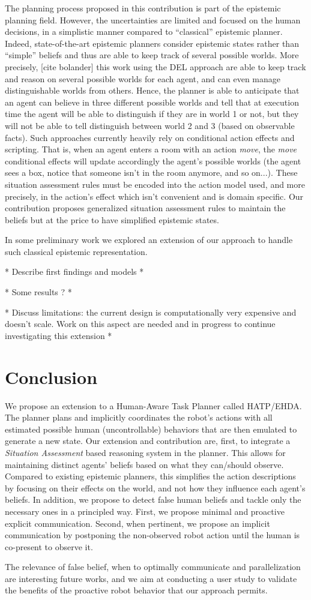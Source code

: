 The planning process proposed in this contribution is part of the epistemic planning field. However, the uncertainties are limited and focused on the human decisions, in a simplistic manner compared to ``classical'' epistemic planner. Indeed, state-of-the-art epistemic planners consider epistemic states rather than ``simple'' beliefs and thus are able to keep track of several possible worlds. More precisely, [cite bolander] this work using the DEL approach are able to keep track and reason on several possible worlds for each agent, and can even manage distinguishable worlds from others. Hence, the planner is able to anticipate that an agent can believe in three different possible worlds and tell that at execution time the agent will be able to distinguish if they are in world 1 or not, but they will not be able to tell distinguish between world 2 and 3 (based on observable facts).
Such approaches currently heavily rely on conditional action effects and scripting. That is, when an agent enters a room with an action \textit{move}, the \textit{move} conditional effects will update accordingly the agent's possible worlds (the agent sees a box, notice that someone isn't in the room anymore, and so on...). These situation assessment rules must be encoded into the action model used, and more precisely, in the action's effect which isn't convenient and is domain specific.
Our contribution proposes generalized situation assessment rules to maintain the beliefs but at the price to have simplified epistemic states.

In some preliminary work we explored an extension of our approach to handle such classical epistemic representation. 

* Describe first findings and models * 

* Some results ? *

* Discuss limitations: the current design is computationally very expensive and doesn't scale. Work on this aspect are needed and in progress to continue investigating this extension * 


\section{Conclusion}

We propose an extension to a Human-Aware Task Planner called HATP/EHDA. 
The planner plans and implicitly coordinates the robot's actions with all estimated possible human (uncontrollable) behaviors that are then emulated to generate a new state.
Our extension and contribution are, first, to integrate a \textit{Situation Assessment} based reasoning system in the planner. This allows for maintaining distinct agents' beliefs based on what they can/should observe.
Compared to existing epistemic planners, this simplifies the action descriptions by focusing on their effects on the world, and not how they influence each agent's beliefs.
In addition, we propose to detect false human beliefs and tackle only the necessary ones in a principled way. First, we propose minimal and proactive explicit communication. Second, when pertinent, 
we propose an implicit communication by postponing the non-observed robot action until the human is co-present to observe it.  

The relevance of false belief, when to optimally communicate and parallelization are interesting future works, and we aim at conducting a user study to validate the benefits of the proactive robot behavior that our approach permits. 